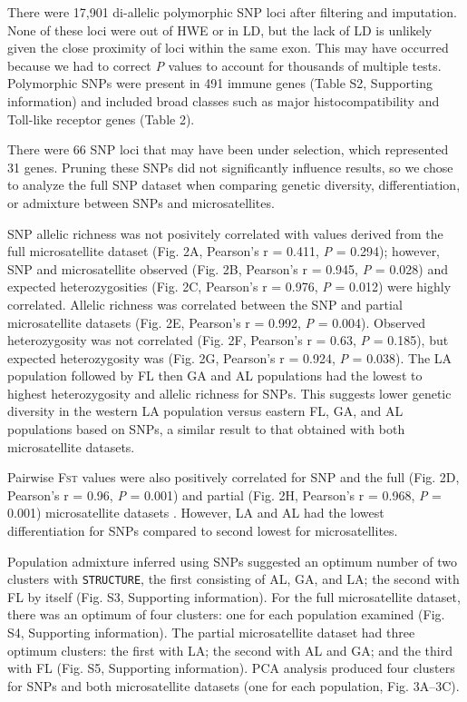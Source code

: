 \documentclass[english]{article}\usepackage[]{graphicx}\usepackage[]{color}
\begin{document}
There were 17,901 di-allelic polymorphic SNP loci after filtering and imputation. None of these loci were out of HWE or in LD, but the lack of LD is unlikely given the close proximity of loci within the same exon. This may have occurred because we had to correct \textit{P} values to account for thousands of multiple tests. Polymorphic SNPs were present in 491 immune genes (Table S2, Supporting information) and included broad classes such as major histocompatibility and Toll-like receptor genes (Table 2).

There were 66 SNP loci that may have been under selection, which represented 31 genes. Pruning these SNPs did not significantly influence results, so we chose to analyze the full SNP dataset when comparing genetic diversity, differentiation, or admixture between SNPs and microsatellites.

SNP allelic richness was not posivitely correlated with values derived from the full microsatellite dataset (Fig. 2A, Pearson's r = 0.411, \textit{P} = 0.294); however, SNP and microsatellite observed (Fig. 2B, Pearson's r = 0.945, \textit{P} = 0.028) and expected heterozygosities (Fig. 2C, Pearson's r = 0.976, \textit{P} = 0.012) were highly correlated. Allelic richness was correlated between the SNP and partial microsatellite datasets (Fig. 2E, Pearson's r = 0.992, \textit{P} = 0.004). Observed heterozygosity was not correlated (Fig. 2F, Pearson's r = 0.63, \textit{P} = 0.185), but expected heterozygosity was (Fig. 2G, Pearson's r = 0.924, \textit{P} = 0.038). The LA population followed by FL then GA and AL populations had the lowest to highest heterozygosity and allelic richness for SNPs. This suggests lower genetic diversity in the western LA population versus eastern FL, GA, and AL populations based on SNPs, a similar result to that obtained with both microsatellite datasets.

Pairwise \textsc{Fst} values were also positively correlated for SNP and the full (Fig. 2D, Pearson's r = 0.96, \textit{P} = 0.001) and partial (Fig. 2H, Pearson's r = 0.968, \textit{P} = 0.001) microsatellite datasets . However, LA and AL had the lowest differentiation for SNPs compared to second lowest for microsatellites.

Population admixture inferred using SNPs suggested an optimum number of two clusters with \texttt{STRUCTURE}, the first consisting of AL, GA, and LA; the second with FL by itself (Fig. S3, Supporting information). For the full microsatellite dataset, there was an optimum of four clusters: one for each population examined (Fig. S4, Supporting information). The partial microsatellite dataset had three optimum clusters: the first with LA; the second with AL and GA; and the third with FL (Fig. S5, Supporting information). PCA analysis produced four clusters for SNPs and both microsatellite datasets (one for each population, Fig. 3A--3C).
\end{document}
